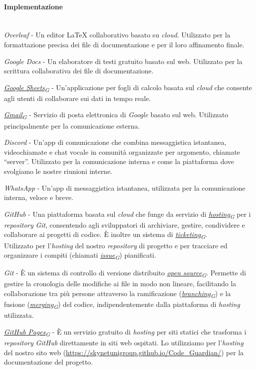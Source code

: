\documentclass[12pt, a4paper]{article}
\newcommand{\urlglossario}{https://skynetunigroup.github.io/Code_Guardian/Documentazione/RTB/glossario_v1.0.0.pdf} %
\newcommand{\glo}[2]{\href{\urlglossario\#nameddest=#2}{#1\textsubscript{G}}}
\begin{document}
 \paragraph{Implementazione}\mbox{}\\
 \textit{Overleaf} - Un editor \LaTeX{} collaborativo basato su \textit{cloud}. Utilizzato per la formattazione precisa dei file di documentazione e per il loro affinamento finale.

 \textit{Google Docs} - Un elaboratore di testi gratuito basato sul web. Utilizzato per la scrittura collaborativa dei file di documentazione.

 \textit{\glo{Google Sheets}{google-sheets}} - Un'applicazione per fogli di calcolo basata sul \textit{cloud} che consente agli utenti di collaborare sui dati in tempo reale.
 
 \textit{\glo{Gmail}{gmail}} - Servizio di posta elettronica di \textit{Google} basato sul web. Utilizzato principalmente per la comunicazione esterna.
 
 \textit{Discord} - Un'app di comunicazione che combina messaggistica istantanea, videochiamate e chat vocale in comunità organizzate per argomento, chiamate ``server''. Utilizzato per la comunicazione interna e come la piattaforma dove svolgiamo le nostre riunioni interne.
 
 \textit{WhatsApp} - Un'app di messaggistica istantanea, utilizzata per la comunicazione interna, veloce e breve.
 
 \textit{GitHub} - Una piattaforma basata sul \textit{cloud} che funge da servizio di \textit{\glo{hosting}{hosting}} per i \textit{repository} \textit{Git}, consentendo agli sviluppatori di archiviare, gestire, condividere e collaborare ai progetti di codice. È inoltre un sistema di \textit{\glo{ticketing}{ticketing}}.\\
Utilizzato per l'\textit{hosting} del nostro \textit{repository} di progetto e per tracciare ed organizzare i compiti (chiamati \textit{\glo{issue}{issue}}) pianificati.

 \textit{Git} - È un sistema di controllo di versione distribuito \textit{\glo{open source}{open-source}}. Permette di gestire la cronologia delle modifiche ai file in modo non lineare, facilitando la collaborazione tra più persone attraverso la ramificazione (\textit{\glo{branching}{branching}}) e la fusione (\textit{\glo{merging}{merging}}) del codice, indipendentemente dalla piattaforma di \textit{hosting} utilizzata.

 \textit{\glo{GitHub Pages}{github-pages}} - È un servizio gratuito di \textit{hosting} per siti statici che trasforma i \textit{repository} \textit{GitHub} direttamente in siti web ospitati. Lo utilizziamo per l'\textit{hosting} del nostro sito web (\href{https://skynetunigroup.github.io/Code_Guardian/}{ {https://skynetunigroup.github.io/Code\_Guardian/}}) per la documentazione del progetto.
\end{document}
